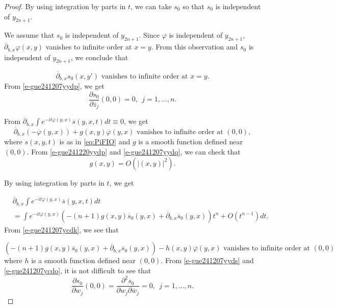 \documentclass[12pt]{amsart}
\theoremstyle{definition}
\theoremstyle{named}
\numberwithin{equation}{subsection}
\newcommand{\ol}{\overline}
\newcommand{\ddbar}{\overline\partial}
\newcommand{\pr}{\partial}
\newcommand{\abs}[1]{\left\vert#1\right\vert}
\begin{document}
\begin{proof}
By using integration by parts in $t$, we can take $s_0$ so that $s_0$ is independent of $y_{2n+1}$.

We assume that $s_0$ is independent of $y_{2n+1}$. Since $\varphi$ is independent of $y_{2n+1}$, $\ddbar_{b,x}\varphi(x,y)$ vanishes to infinite order at $x=y$. From this observation and $s_0$ is independent of $y_{2n+1}$, we conclude that 

\begin{equation}\label{e-gue241207yydp}
\mbox{$\ddbar_{b,x}s_0(x,y')$ vanishes to infinite order at $x=y$}.
\end{equation}
From \eqref{e-gue241207yydp}, we get 
\begin{equation}\label{e-gue241207yydq}
\frac{\pr s_0}{\pr\ol z_j}(0,0)=0,\ \ j=1,\ldots,n.
\end{equation} 

From $\ddbar_{b,x}\int e^{-it\ol\varphi(y,x)}\ol s(y,x,t)dt\equiv0$, we get 
\begin{equation}\label{e-gue241207yydr}
\mbox{$\ddbar_{b,x}(-\ol\varphi(y,x))+g(x,y)\ol\varphi(y,x)$ vanishes to infinite order at $(0,0)$},
\end{equation}
where $s(x,y,t)$ is as in \eqref{eq:PiFIO}  and $g$ is a smooth function defined near $(0,0)$. From \eqref{e-gue241220yydp} and \eqref{e-gue241207yydq}, we can check that 
\begin{equation}\label{e-gue241207yyds}
g(x,y)=O(\abs{(x,y)}^2).
\end{equation}

By using integration by parts in $t$, we get 

\begin{equation}\label{e-gue241207ycdk}
\begin{split}
&\ddbar_{b,x}\int e^{-it\ol\varphi(y,x)}\ol s(y,x,t)dt\\
&=\int e^{-it\ol\varphi(y,x)}(-(n+1)g(x,y)\ol s_0(y,x)+\ddbar_{b,x}\ol s_0(y,x))t^n+O(t^{n-1})dt.
\end{split}
\end{equation}
From \eqref{e-gue241207ycdk}, we see that 

\begin{equation}\label{e-gue241207ycdo}
\mbox{$(-(n+1)g(x,y)\ol s_0(y,x)+\ddbar_{b,x}\ol s_0(y,x))-h(x,y)\ol\varphi(y,x)$ vanishes to infinite order at $(0,0)$}, 
\end{equation}
where $h$ is a smooth function defined near $(0,0)$. From \eqref{e-gue241207yyds} and \eqref{e-gue241207ycdo}, it is not difficult to see that 
\begin{equation}\label{e-gue241207ycdg}
\frac{\pr s_0}{\pr w_j}(0,0)=\frac{\pr^2 s_0}{\pr w_j\pr\ol w_j}=0,\ \ j=1,\ldots,n.
\end{equation}


\end{proof}
\end{document}
